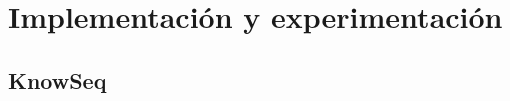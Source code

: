 \cleardoublepage
\clearpage{}

\chapter[Implementación y experimentación]{Implementación y experimentación}

\section{KnowSeq}